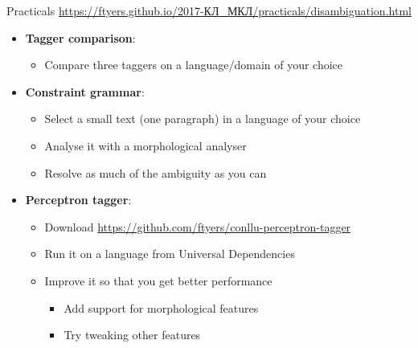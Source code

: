 \documentclass{beamer}
\begin{document}

 

\begin{frame}{Practicals}
\url{https://ftyers.github.io/2017-КЛ\_МКЛ/practicals/disambiguation.html}

\begin{itemize}
  \item \textbf{Tagger comparison}:
  \begin{itemize}
     \item Compare three taggers on a language/domain of your choice
  \end{itemize}
  \item \textbf{Constraint grammar}: 
  \begin{itemize}
     \item Select a small text (one paragraph) in a language of your choice
     \item Analyse it with a morphological analyser
     \item Resolve as much of the ambiguity as you can
  \end{itemize}
  \item \textbf{Perceptron tagger}:
  \begin{itemize}
     \item Download \url{https://github.com/ftyers/conllu-perceptron-tagger}
     \item Run it on a language from Universal Dependencies
     \item Improve it so that you get better performance
     \begin{itemize}
       \item Add support for morphological features
       \item Try tweaking other features
     \end{itemize}
  \end{itemize}
\end{itemize}

\end{frame}
\end{document}
